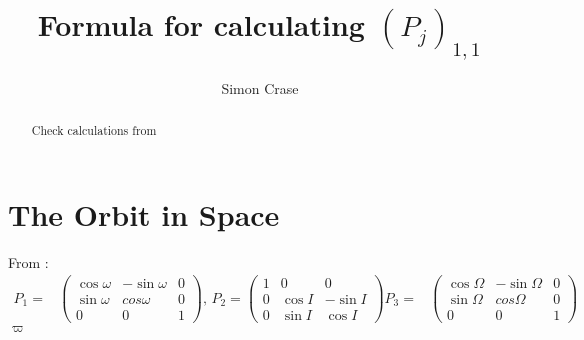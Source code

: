 \documentclass[]{article}
\title{Formula for calculating $(P_j)_{1,1}$}
\author{Simon Crase}
\begin{document}
\maketitle
\tableofcontents
\begin{abstract}
Check calculations from \cite{ssd}
\end{abstract}

\section{The Orbit in Space}

From  \cite[(2.119) and (2.120)]{ssd}:
\begin{align*}
P_1 =& \begin{pmatrix}
\cos \omega & - \sin \omega & 0\\
\sin \omega & cos \omega & 0\\
0 & 0  & 1
\end{pmatrix}
\text{, }
P_2 = \begin{pmatrix}
1 & 0 & 0\\
0 & \cos I & - \sin I\\
0 & \sin I & \cos I
\end{pmatrix}
P_3 =& \begin{pmatrix}
\cos \Omega & - \sin \Omega & 0\\
\sin \Omega & cos \Omega & 0\\
0 & 0  & 1
\end{pmatrix}
\end{align*}
$\varpi$
\end{document}

